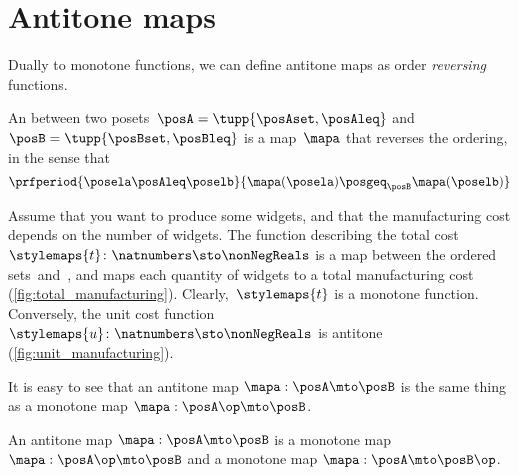 \section{Antitone maps}

Dually to monotone functions, we can define antitone maps as order \emph{reversing} functions.

\begin{definition}
    \label{def:antitone}
    An \emph{} between two posets~$\posA=\tupp{\posAset, \posAleq}$ and~$\posB=\tupp{\posBset, \posBleq}$ is a map~$\mapa$ that reverses the ordering, in the sense that
    \begin{equation}
        \prfperiod{
            \posela \posAleq \poselb
        }{
            \mapa(\posela) \posgeq_\posB \mapa(\poselb)
        }
    \end{equation}
\end{definition}

\begin{example}
    Assume that you want to produce some widgets, and that the manufacturing cost depends on the number of widgets.
    The function describing the total cost~$\stylemaps{t}\colon \natnumbers \sto \nonNegReals$ is a map between the ordered sets~\natnumbers and~\nonNegReals, and maps each quantity of widgets to a total manufacturing cost (\cref{fig:total_manufacturing}).
    Clearly,~$\stylemaps{t}$ is a monotone function.
    Conversely, the unit cost function~$\stylemaps{u}\colon \natnumbers \sto \nonNegReals$ is antitone (\cref{fig:unit_manufacturing}).
\end{example}

\begin{figure}[h!]
\end{figure}

It is easy to see that an antitone map $\mapa: \posA \mto \posB$ is the same thing as a monotone map $\mapa: \posA\op \mto \posB$.

\begin{lemma}\label{lem:antitone-is-monotone}
    An antitone map  $\mapa: \posA \mto \posB$ is a monotone map $\mapa: \posA\op \mto \posB$
    and a monotone map $\mapa: \posA \mto \posB\op$.
\end{lemma}
